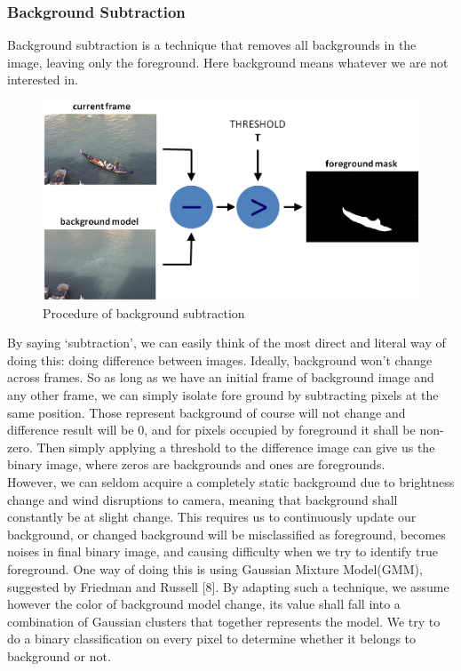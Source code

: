 \documentclass{article}
\begin{document}
\subsubsection{Background Subtraction}
Background subtraction is a technique that removes all backgrounds in the image, leaving only the foreground. Here background means whatever we are not interested in.\\
\begin{figure}
  \centering
  \includegraphics[scale=0.9]{report/pic/2/Background_Subtraction_Tutorial_Scheme.png} 
  \caption{Procedure of background subtraction}
\end{figure}
By saying ‘subtraction’, we can easily think of the most direct and literal way of doing this: doing difference between images. Ideally, background won’t change across frames. So as long as we have an initial frame of background image and any other frame, we can simply isolate fore ground by subtracting pixels at the same position. Those represent background of course will not change and difference result will be 0, and for pixels occupied by foreground it shall be non-zero. Then simply applying a threshold to the difference image can give us the binary image, where zeros are backgrounds and ones are foregrounds.\\
However, we can seldom acquire a completely static background due to brightness change and wind disruptions to camera, meaning that background shall constantly be at slight change. This requires us to continuously update our background, or changed background will be misclassified as foreground, becomes noises in final binary image, and causing difficulty when we try to identify true foreground.
One way of doing this is using Gaussian Mixture Model(GMM), suggested by Friedman and Russell [8]. By adapting such a technique, we assume however the color of background model change, its value shall fall into a combination of Gaussian clusters that together represents the model. We try to do a binary classification on every pixel to determine whether it belongs to background or not.\\
\end{document}
